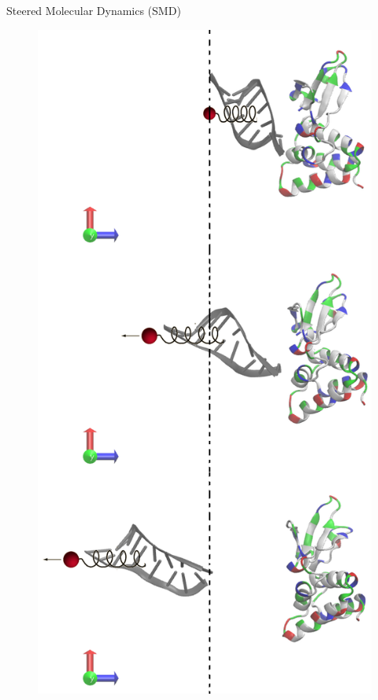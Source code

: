 \documentclass[10pt]{beamer}
\begin{document}
	\begin{frame}{Steered Molecular Dynamics (SMD)}
		\begin{figure}
		\vspace{-25pt}
		\includegraphics[height=0.7\textheight,natwidth=610,natheight=642]{../smd}

\end{figure}
\end{frame}
\end{document}
